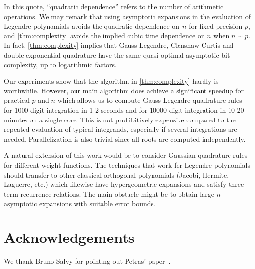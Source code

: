 \documentclass[nohypdvips,review]{siamart0216}
\begin{document}
In this quote, ``quadratic dependence'' refers to the number of arithmetic operations.
We may remark that using asymptotic expansions in the
evaluation of Legendre polynomials avoids the quadratic
dependence on~$n$ for fixed precision $p$, and \cref{thm:complexity}
avoids the implied cubic time dependence on $n$ when $n \sim p$.
In fact, \cref{thm:complexity} implies that
Gauss-Legendre, Clenshaw-Curtis and double exponential
quadrature have the same quasi-optimal asymptotic bit complexity,
up to logarithmic factors.

Our experiments show that the algorithm in \cref{thm:complexity}
hardly is worthwhile. However, our main algorithm does achieve a
significant speedup for practical $p$ and $n$
which allows us to compute Gauss-Legendre quadrature rules for
1000-digit integration in 1-2 seconds and for 10000-digit integration in 10-20 minutes
on a single core. This is not prohibitively
expensive compared to the repeated evaluation
of typical integrands, especially if several integrations are needed.
Parallelization is also trivial since all roots
are computed independently.

A natural extension of this work would be to
consider Gaussian quadrature rules for different
weight functions.
The techniques that work for Legendre polynomials should transfer to other
classical orthogonal polynomials (Jacobi, Hermite, Laguerre, etc.)
which likewise have hypergeometric expansions
and satisfy three-term recurrence relations.
The main obstacle might be
to obtain large-$n$ asymptotic expansions with suitable error bounds.

\section*{Acknowledgements}

We thank Bruno Salvy for pointing out Petras' paper~\cite{petras1999computation}.



\end{document}

